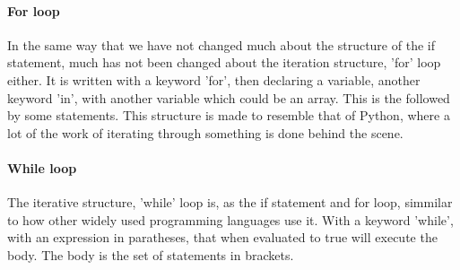 \paragraph*{For loop}
In the same way that we have not changed much about the structure of the if statement, much has not been changed about the iteration structure, 'for' loop either. It is written with a keyword 'for', then declaring a variable, another keyword 'in', with another variable which could be an array. This is the followed by some statements.
This structure is made to resemble that of Python, where a lot of the work of iterating through something is done behind the scene.



\paragraph*{While loop}
The iterative structure, 'while' loop is, as the if statement and for loop, simmilar to how other widely used programming languages use it. With a keyword 'while', with an expression in paratheses, that when evaluated to true will execute the body. The body is the set of statements in brackets. 

